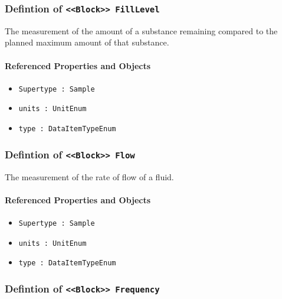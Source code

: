 \subsubsection{Defintion of \texttt{<<Block>> FillLevel}}
  \label{type:FillLevel}

\FloatBarrier

The measurement of the amount of a substance remaining compared to the planned maximum amount of that substance.

\FloatBarrier
\paragraph{Referenced Properties and Objects}

\begin{itemize}
\item \texttt{Supertype : Sample}

\item \texttt{units : UnitEnum}

\item \texttt{type : DataItemTypeEnum}

\end{itemize}
\FloatBarrier
\subsubsection{Defintion of \texttt{<<Block>> Flow}}
  \label{type:Flow}

\FloatBarrier

The measurement of the rate of flow of a fluid.

\FloatBarrier
\paragraph{Referenced Properties and Objects}

\begin{itemize}
\item \texttt{Supertype : Sample}

\item \texttt{units : UnitEnum}

\item \texttt{type : DataItemTypeEnum}

\end{itemize}
\FloatBarrier
\subsubsection{Defintion of \texttt{<<Block>> Frequency}}
  \label{type:Frequency}

